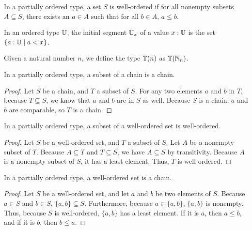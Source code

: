 \documentclass[../math.tex]{subfiles}
\begin{document}
\begin{definition}
    In a partially ordered type, a set $S$ is well-ordered if for all nonempty
    subsets $A \subseteq S$, there exists an $a \in A$ such that for all $b \in
    A$, $a \leq b$.
\end{definition}

\begin{definition}
    In an ordered type $\mathbb{U}$, the initial segment $\mathbb{U}_x$ of a value $x : \mathbb{U}$ is
    the set $\{a : \mathbb{U} \mid a < x\}$.
\end{definition}

\begin{definition}
    Given a natural number $n$, we define the type $\mathbb{T}(n)$ as $\mathbb{T}(\mathbb{N}_n)$.
\end{definition}

\begin{theorem}
    In a partially ordered type, a subset of a chain is a chain.
\end{theorem}
\begin{proof}
    Let $S$ be a chain, and $T$ a subset of $S$.  For any two elements $a$ and
    $b$ in $T$, because $T \subseteq S$, we know that $a$ and $b$ are in $S$ as
    well.  Because $S$ is a chain, $a$ and $b$ are comparable, so $T$ is a
    chain.
\end{proof}

\begin{theorem}
    In a partially ordered type, a subset of a well-ordered set is well-ordered.
\end{theorem}
\begin{proof}
    Let $S$ be a well-ordered set, and $T$ a subset of $S$.  Let $A$ be a
    nonempty subset of $T$.  Because $A \subseteq T$ and $T \subseteq S$, we
    have $A \subseteq S$ by transitivity.  Because $A$ is a nonempty subset of
    $S$, it has a least element.  Thus, $T$ is well-ordered.
\end{proof}

\begin{theorem}
    In a partially ordered type, a well-ordered set is a chain.
\end{theorem}
\begin{proof}
    Let $S$ be a well-ordered set, and let $a$ and $b$ be two elements of $S$.
    Because $a \in S$ and $b \in S$, $\{a, b\} \subseteq S$.  Furthermore,
    because $a \in \{a, b\}$, $\{a, b\}$ is nonempty.  Thus, because $S$ is
    well-ordered, $\{a, b\}$ has a least element.  If it is $a$, then $a \leq
    b$, and if it is $b$, then $b \leq a$.
\end{proof}
\end{document}
